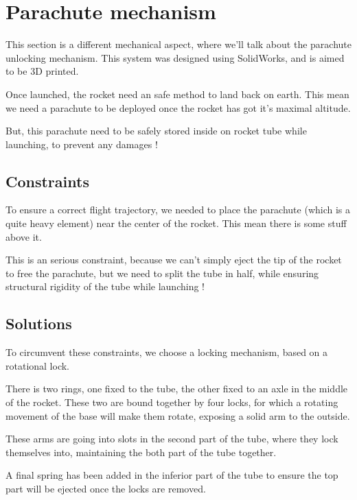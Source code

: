 \section{Parachute mechanism}
This section is a different mechanical aspect, where we'll talk about the parachute
unlocking mechanism. This system was designed using SolidWorks, and is aimed to be
3D printed.

Once launched, the rocket need an safe method to land back on earth. This mean
we need a parachute to be deployed once the rocket has got it's maximal
altitude.

But, this parachute need to be safely stored inside on rocket tube while
launching, to prevent any damages !

\subsection{Constraints}
To ensure a correct flight trajectory, we needed to place the parachute (which
is a quite heavy element) near the center of the rocket. This mean there is
some stuff above it.

This is an serious constraint, because we can't simply eject the tip of the
rocket to free the parachute, but we need to split the tube in half, while
ensuring structural rigidity of the tube while launching !

\subsection{Solutions}
To circumvent these constraints, we choose a locking mechanism, based on a
rotational lock.

There is two rings, one fixed to the tube, the other fixed to an axle in the
middle of the rocket. These two are bound together by four locks, for which a
rotating movement of the base will make them rotate, exposing a solid arm to
the outside.

These arms are going into slots in the second part of the tube, where they lock
themselves into, maintaining the both part of the tube together.

A final spring has been added in the inferior part of the tube to ensure the
top part will be ejected once the locks are removed.
